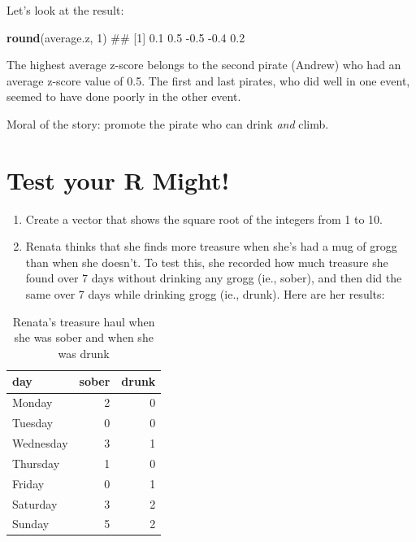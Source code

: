 \documentclass[]{book}
\newenvironment{Shaded}{\begin{snugshade}}{\end{snugshade}}
\newcommand{\KeywordTok}[1]{\textcolor[rgb]{0.13,0.29,0.53}{\textbf{{#1}}}}
\newcommand{\DecValTok}[1]{\textcolor[rgb]{0.00,0.00,0.81}{{#1}}}
\newcommand{\NormalTok}[1]{{#1}}
\theoremstyle{definition}
\theoremstyle{definition}
\theoremstyle{remark}
\begin{document}
Let's look at the result:

\begin{Shaded}
\begin{Highlighting}[]
\KeywordTok{round}\NormalTok{(average.z, }\DecValTok{1}\NormalTok{)}
\NormalTok{## [1]  0.1  0.5 -0.5 -0.4  0.2}
\end{Highlighting}
\end{Shaded}

The highest average z-score belongs to the second pirate (Andrew) who
had an average z-score value of 0.5. The first and last pirates, who did
well in one event, seemed to have done poorly in the other event.

Moral of the story: promote the pirate who can drink \emph{and} climb.

\section{Test your R Might!}\label{test-your-r-might-2}

\begin{enumerate}
\def\labelenumi{\arabic{enumi}.}
\item
  Create a vector that shows the square root of the integers from 1 to
  10.
\item
  Renata thinks that she finds more treasure when she's had a mug of
  grogg than when she doesn't. To test this, she recorded how much
  treasure she found over 7 days without drinking any grogg (ie.,
  sober), and then did the same over 7 days while drinking grogg (ie.,
  drunk). Here are her results:
\end{enumerate}

\begin{table}

\caption{\label{tab:unnamed-chunk-143}Renata's treasure haul when she was sober and when she was drunk}
\centering
\begin{tabular}[t]{l|r|r}
\hline
day & sober & drunk\\
\hline
Monday & 2 & 0\\
\hline
Tuesday & 0 & 0\\
\hline
Wednesday & 3 & 1\\
\hline
Thursday & 1 & 0\\
\hline
Friday & 0 & 1\\
\hline
Saturday & 3 & 2\\
\hline
Sunday & 5 & 2\\
\hline
\end{tabular}
\end{table}
\end{document}
